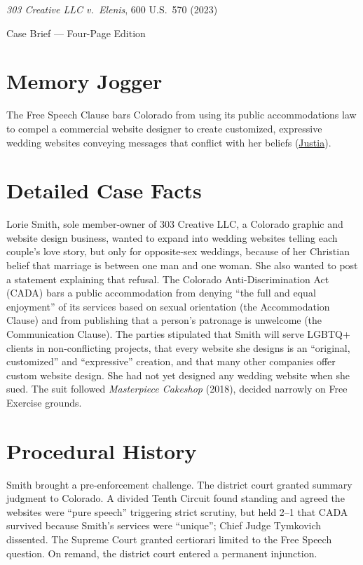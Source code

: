 \documentclass[12pt]{article}
\begin{document}
\begin{center}
{\LARGE \textit{303 Creative LLC v.\ Elenis}, 600 U.S.\ 570 (2023)\par}
\vspace{0.8em}
{\large Case Brief --- Four-Page Edition\par}
\end{center}
\vspace{1em}

\section{Memory Jogger}

The Free Speech Clause bars Colorado from using its public accommodations law to compel a commercial website designer to create customized, expressive wedding websites conveying messages that conflict with her beliefs (\href{https://supreme.justia.com/cases/federal/us/600/21-476/}{Justia}).

\section{Detailed Case Facts}

Lorie Smith, sole member-owner of 303 Creative LLC, a Colorado graphic and website design business, wanted to expand into wedding websites telling each couple's love story, but only for opposite-sex weddings, because of her Christian belief that marriage is between one man and one woman. She also wanted to post a statement explaining that refusal. The Colorado Anti-Discrimination Act (CADA) bars a public accommodation from denying ``the full and equal enjoyment'' of its services based on sexual orientation (the Accommodation Clause) and from publishing that a person's patronage is unwelcome (the Communication Clause). The parties stipulated that Smith will serve LGBTQ+ clients in non-conflicting projects, that every website she designs is an ``original, customized'' and ``expressive'' creation, and that many other companies offer custom website design. She had not yet designed any wedding website when she sued. The suit followed \textit{Masterpiece Cakeshop} (2018), decided narrowly on Free Exercise grounds.

\section{Procedural History}

Smith brought a pre-enforcement challenge. The district court granted summary judgment to Colorado. A divided Tenth Circuit found standing and agreed the websites were ``pure speech'' triggering strict scrutiny, but held 2--1 that CADA survived because Smith's services were ``unique''; Chief Judge Tymkovich dissented. The Supreme Court granted certiorari limited to the Free Speech question. On remand, the district court entered a permanent injunction.
\end{document}
